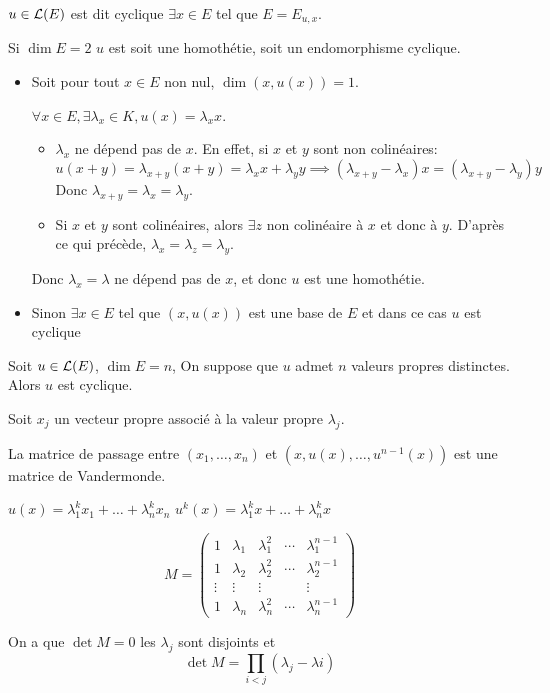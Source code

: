 \begin{definition}
	$u \in \mathcal{L}(E)$ est dit cyclique \ssi $\exists x \in E$ tel que $E = E_{u,x}$.
\end{definition}

\begin{example}
	Si $\dim E = 2$ $u$ est soit une homothétie, soit un endomorphisme cyclique.

	\begin{itemize}
		\item Soit pour tout $x \in E$ non nul, $\dim (x, u(x)) = 1$.

		      $\forall x \in E, \exists \lambda_x \in K, u(x) = \lambda_x x$.

		      \begin{itemize}
			      \item $\lambda_x$ ne dépend pas de $x$. En effet, si $x$ et $y$ sont non colinéaires:
			            $$ u (x+y) = \lambda_{x+y} (x+y) = \lambda_x x + \lambda_y y \implies (\lambda_{x+y} - \lambda_x) x = (\lambda_{x+y} - \lambda_y) y$$
			            Donc $\lambda_{x+y} = \lambda_x = \lambda_y$.

			      \item Si $x$ et $y$ sont colinéaires, alors $\exists z$ non colinéaire à $x$ et donc à $y$. D'après ce qui précède, $\lambda_x = \lambda_z = \lambda_y$.
		      \end{itemize}

		      Donc $\lambda_x = \lambda$ ne dépend pas de $x$, et donc $u$ est une homothétie.

		\item Sinon $\exists x \in E$ tel que $(x, u(x))$ est une base de $E$ et dans ce cas $u$ est cyclique
	\end{itemize}
\end{example}

\begin{example}
	Soit $u \in \mathcal{L}(E)$, $\dim E = n$, On suppose que $u$ admet $n$ valeurs propres distinctes. Alors $u$ est cyclique.

	Soit $x_j$ un vecteur propre associé à la valeur propre $\lambda_j$.

	La matrice de passage entre $(x_1, \dots, x_n)$ et $(x, u(x), \dots, u^{n-1}(x))$ est une matrice de Vandermonde.

	$u(x) = \lambda_1^k x_1 + \dots + \lambda_n^{k}x_n$
	$u^k(x) = \lambda_1^k x + \dots + \lambda_n^{k}x$

	\begin{equation*}
		M = \begin{pmatrix}
			1      & \lambda_1 & \lambda_1^2 & \cdots & \lambda_1^{n-1} \\
			1      & \lambda_2 & \lambda_2^2 & \cdots & \lambda_2^{n-1} \\
			\vdots & \vdots    & \vdots      &        & \vdots          \\
			1      & \lambda_n & \lambda_n^2 & \cdots & \lambda_n^{n-1}
		\end{pmatrix}
	\end{equation*}

	On a que $\det M = 0 $ \ssi les $\lambda_j$ sont disjoints et
	$$ \det M = \prod_{i < j} (\lambda_j-\lambda i)$$
\end{example}

